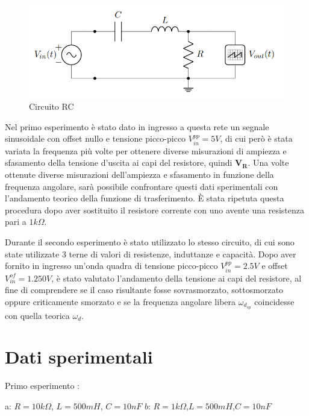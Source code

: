     \begin{figure}[!h]
        \begin{center}
            \includegraphics[width = 6 cm]{circuito.png}
            \caption{Circuito RC}
        \end{center}
    \end{figure}

    Nel primo esperimento è stato dato in ingresso a questa rete un segnale sinusoidale con offset nullo e 
    tensione picco-picco $V^{pp}_{in} = 5V$, di cui però è stata variata la frequenza più volte per ottenere diverse misurazioni
    di ampiezza e sfasamento della tensione d'uscita ai capi del resistore, quindi $\mathbf{V_R}$. Una volte ottenute diverse
    misurazioni dell'ampiezza e sfasamento in funzione della frequenza angolare, sarà possibile confrontare questi dati sperimentali
    con l'andamento teorico della funzione di trasferimento.
    È stata ripetuta questa procedura dopo aver sostituito il resistore corrente con uno avente una resistenza
    pari a $1k\Omega$. \par
    Durante il secondo esperimento è stato utilizzato lo stesso circuito, di cui sono state utilizzate 3 terne di valori di
    resistenze, induttanze e capacità. Dopo aver fornito in ingresso un'onda quadra di tensione picco-picco $V^{pp}_{in} = 2.5 V$
    e offset $V^{of}_{in} = 1.250 V$, è stato valutato l'andamento della tensione ai capi del resistore, al fine 
    di comprendere se il caso risultante fosse sovrasmorzato, sottosmorzato oppure criticamente smorzato e se la frequenza angolare libera $\omega_{d_{sp}}$
    coincidesse con quella teorica $\omega_d$. \par

    
    \section{Dati sperimentali}
    Primo esperimento : \par
    a: $R=10k\Omega$, $L=500mH$, $C=10nF$ \hspace{2.4cm} $b$: $R = 1k\Omega$,$L = 500mH $,$C = 10nF$
    
